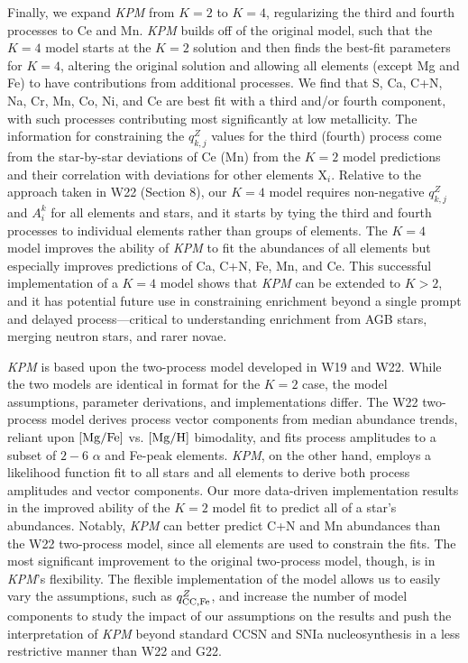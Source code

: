 \documentclass[modern, linenumbers]{aastex631}
\newcommand{\mgfe}[0]{[{\rm Mg/Fe}]}
\newcommand{\mgh}{[{\rm Mg}/{\rm H}]}
\newcommand{\qccFe}{q_{{\rm CC, Fe}}^{Z}}
\newcommand{\name}{\textsl{KPM}}
\begin{document}
Finally, we expand \name{} from $K=2$ to $K=4$, regularizing the third and fourth processes to Ce and Mn. \name{} builds off of the original model, such that the $K=4$ model starts at the $K=2$ solution and then finds the best-fit parameters for $K=4$, altering the original solution and allowing all elements (except Mg and Fe) to have contributions from additional processes. We find that S, Ca, C+N, Na, Cr, Mn, Co, Ni, and Ce are best fit with a third and/or fourth component, with such processes contributing most significantly at low metallicity. 
The information for constraining the $q^{Z}_{k,j}$ values for the third (fourth) process come from the star-by-star deviations of Ce (Mn) from the $K=2$ model predictions and their correlation with deviations for other elements $\text{X}_i$. Relative to the approach taken in W22 (Section 8), our $K=4$ model requires non-negative $q^Z_{k,j}$ and $A_i^k$ for all elements and stars, and it starts by tying the third and fourth processes to individual elements rather than groups of elements.
The $K=4$ model improves the ability of \name{} to fit the abundances of all elements but especially improves predictions of Ca, C+N, Fe, Mn, and Ce. This successful implementation of a $K=4$ model shows that \name{} can be extended to $K>2$, and it has potential future use in constraining enrichment beyond a single prompt and delayed process---critical to understanding enrichment from AGB stars, merging neutron stars, and rarer novae. 

\name{} is based upon the two-process model developed in W19 and W22. While the two models are identical in format for the $K=2$ case, the model assumptions, parameter derivations, and implementations differ. The W22 two-process model derives process vector components from median abundance trends, reliant upon $\mgfe$ vs. $\mgh$ bimodality, and fits process amplitudes to a subset of $2-6$ $\alpha$ and Fe-peak elements. \name{}, on the other hand, employs a likelihood function fit to all stars and all elements to derive both process amplitudes and vector components. Our more data-driven implementation results in the improved ability of the $K=2$ model fit to predict all of a star's abundances. Notably, \name{} can better predict C+N and Mn abundances than the W22 two-process model, since all elements are used to constrain the fits. The most significant improvement to the original two-process model, though, is in \name{}'s flexibility. The flexible implementation of the model allows us to easily vary the assumptions, such as $\qccFe$, and increase the number of model components to study the impact of our assumptions on the results and push the interpretation of \name{} beyond standard CCSN and SNIa nucleosynthesis in a less restrictive manner than W22 and G22. 
\end{document}
